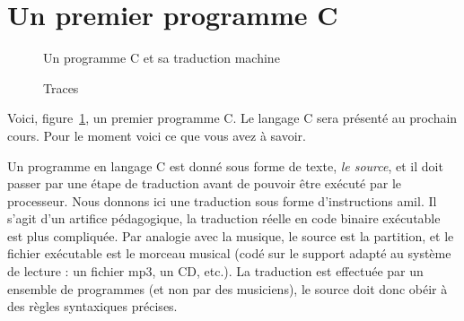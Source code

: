 
\newcommand{\commentaire}[1]{}


\section{Un premier programme C}


\begin{figure}[h]
  \centering
  \hfill
\caption{Un programme C et sa traduction machine}
\label{fig:programmes}
\end{figure}

\begin{figure}[h]
  \centering
  \caption{Traces}
\label{fig:traces}
\end{figure}

Voici, figure~\ref{fig:programmes}, un premier programme C. Le langage C sera présenté au prochain cours. Pour le moment voici ce que vous avez à savoir. 

Un programme en langage C est donné sous forme de texte, \emph{le source}, et il doit passer par une étape de traduction avant de pouvoir être exécuté par le processeur. Nous donnons ici une traduction sous forme d'instructions amil. Il s'agit d'un artifice pédagogique, la traduction réelle en code binaire exécutable est plus compliquée.  Par analogie avec la musique, le source est la partition, et le fichier exécutable est le morceau musical (codé sur le support adapté au système de lecture : un fichier mp3, un CD, etc.). La traduction est effectuée par un ensemble de programmes (et non par des musiciens), le source doit donc obéir à des règles syntaxiques précises.  

